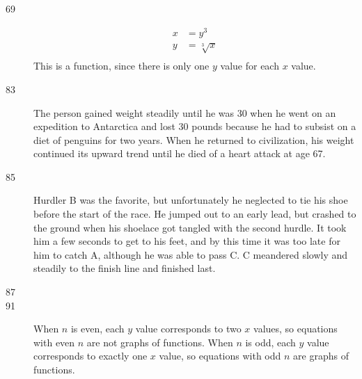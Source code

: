 \documentclass{exam}
\begin{document}
\begin{description}
    \item[69]
      \begin{align*}
        x &= y^3 \\
        y &= \sqrt[3]{x} \\
      \end{align*}
      This is a function, since there is only one $y$ value for each $x$ value.

    \item[83]
      The person gained weight steadily until he was 30 when he went on an expedition to Antarctica and lost 30 pounds because
      he had to subsist on a diet of penguins for two years.  When he returned to civilization, his weight continued its upward
      trend until he died of a heart attack at age 67.

    \item[85]
      Hurdler B was the favorite, but unfortunately he neglected to tie his shoe before the start of the race.  He
      jumped out to an early lead, but crashed to the ground when his shoelace got tangled with the second hurdle.  It
      took him a few seconds to get to his feet, and by this time it was too late for him to catch A, although he was
      able to pass C.  C meandered slowly and steadily to the finish line and finished last.      

    \item[87]

    \item[91]
      When $n$ is even, each $y$ value corresponds to two $x$ values, so equations with even $n$ are not graphs of functions.
      When $n$ is odd, each $y$ value corresponds to exactly one $x$ value, so equations with odd $n$ are graphs of
      functions.

  \end{description}
\end{document}
